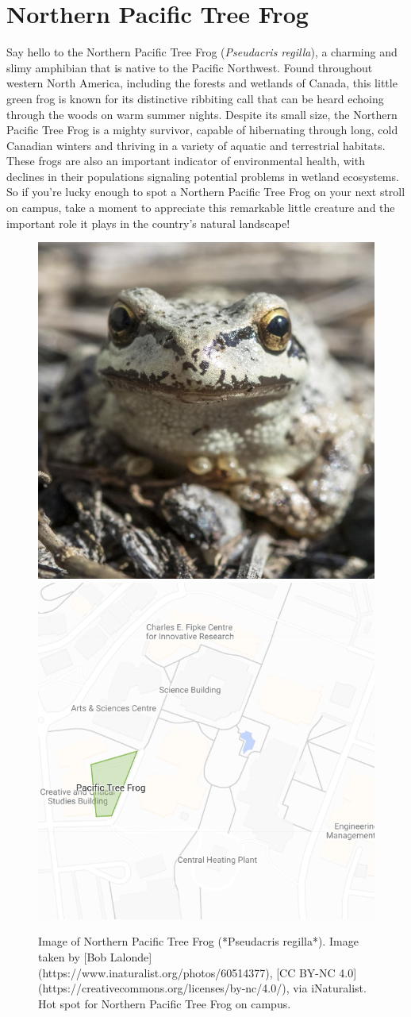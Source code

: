 \documentclass[
]{book}
\begin{document}
\hypertarget{northern-pacific-tree-frog}{%
\section{Northern Pacific Tree Frog}\label{northern-pacific-tree-frog}}

Say hello to the Northern Pacific Tree Frog (\emph{Pseudacris regilla}), a charming and slimy amphibian that is native to the Pacific Northwest. Found throughout western North America, including the forests and wetlands of Canada, this little green frog is known for its distinctive ribbiting call that can be heard echoing through the woods on warm summer nights. Despite its small size, the Northern Pacific Tree Frog is a mighty survivor, capable of hibernating through long, cold Canadian winters and thriving in a variety of aquatic and terrestrial habitats. These frogs are also an important indicator of environmental health, with declines in their populations signaling potential problems in wetland ecosystems. So if you're lucky enough to spot a Northern Pacific Tree Frog on your next stroll on campus, take a moment to appreciate this remarkable little creature and the important role it plays in the country's natural landscape!

\begin{figure}

{\centering \includegraphics[width=0.49\linewidth,height=0.2\textheight]{animal_images/forg_11} \includegraphics[width=0.49\linewidth,height=0.2\textheight]{animal_images/forg_hotspot_11} 

}

\caption{Image of Northern Pacific Tree Frog (*Pseudacris regilla*). Image taken by [Bob Lalonde](https://www.inaturalist.org/photos/60514377), [CC BY-NC 4.0](https://creativecommons.org/licenses/by-nc/4.0/), via iNaturalist. Hot spot for Northern Pacific Tree Frog on campus.}\label{fig:unnamed-chunk-3}
\end{figure}
\end{document}

